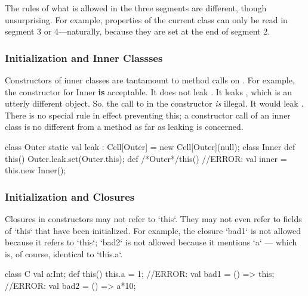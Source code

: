 The rules of what is allowed in the three segments are different, though
unsurprising.  For example, properties of the current class can only be read
in segment 3 or 4---naturally, because they are set at the end of segment 2.

\subsubsection{Initialization and Inner Classses}

Constructors of inner classes are tantamount to method calls on .
For example, the constructor for Inner {\bf is} acceptable.  It does not leak
.  It leaks , which is an utterly different object.
So, the call to  in the  constructor {\em
is} illegal.  It would leak .  There is no special rule in effect
preventing this; a constructor call of an inner class is no
different from a method as far as leaking is concerned.
\begin{xten}
class Outer {
  static val leak : Cell[Outer] = new Cell[Outer](null);
  class Inner {
     def this() {Outer.leak.set(Outer.this);}
  }
  def /*Outer*/this() {
     //ERROR: val inner = this.new Inner();
  }
}
\end{xten}
%



\subsubsection{Initialization and Closures}

Closures in constructors may not refer to \xcd`this`.  They may not even refer
to fields of \xcd`this` that have been initialized.   For example, the
closure \xcd`bad1` is not allowed because it refers to \xcd`this`; \xcd`bad2`
is not allowed because it mentions \xcd`a` --- which is, of course, identical
to \xcd`this.a`. 

\begin{xten}
class C {
  val a:Int;
  def this() {
    this.a = 1;
    //ERROR: val bad1 = () => this; 
    //ERROR: val bad2 = () => a*10;
  }
}
\end{xten}
%


